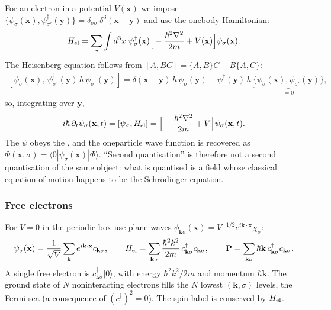 \documentclass[letterpaper,10pt,english]{jupyterBook}
\begin{document}
\sphinxAtStartPar
For an electron in a potential \(V(\mathbf x)\) we impose \(\{\psi_\sigma(\mathbf x),\psi_{\sigma'}^\dagger(\mathbf y)\}=\delta_{\sigma\sigma'}\delta^3(\mathbf x-\mathbf y)\) and use the one\sphinxhyphen{}body Hamiltonian:
\begin{equation*}
\begin{split}
H_{\rm el}=\sum_\sigma\int d^3x\;\psi_\sigma^\dagger(\mathbf x)\Big[-\frac{\hbar^2\nabla^2}{2m}+V(\mathbf x)\Big]\psi_\sigma(\mathbf x).
\end{split}
\end{equation*}
\sphinxAtStartPar
The Heisenberg equation follows from \([A,BC]=\{A,B\}C-B\{A,C\}\):
\begin{equation*}
\begin{split}
[\psi_\sigma(\mathbf x),\,\psi^\dagger_{\sigma'}(\mathbf y)\,h\,\psi_{\sigma'}(\mathbf y)]=\delta(\mathbf x-\mathbf y)\,h\,\psi_\sigma(\mathbf y)-\psi^\dagger(\mathbf y)\,h\,\underbrace{\{\psi_\sigma(\mathbf x),\psi_{\sigma'}(\mathbf y)\}}_{=0},
\end{split}
\end{equation*}
\sphinxAtStartPar
so, integrating over \(\mathbf y\),
\begin{equation*}
\begin{split}
i\hbar\,\partial_t\psi_\sigma(\mathbf x,t)=[\psi_\sigma,H_{\rm el}]=\Big[-\frac{\hbar^2\nabla^2}{2m}+V\Big]\psi_\sigma(\mathbf x,t).
\end{split}
\end{equation*}
\sphinxAtStartPar
The  \(\psi\) obeys the , and the one\sphinxhyphen{}particle wave function is recovered as \(\Phi(\mathbf x,\sigma)=\langle0|\psi_\sigma(\mathbf x)|\Phi\rangle\). “Second quantisation” is therefore not a second quantisation of the same object: what is quantised is a field whose classical equation of motion happens to be the Schrödinger equation.
\subsubsection*{Free electrons}

\sphinxAtStartPar
For \(V=0\) in the periodic box use plane waves \(\phi_{\mathbf k\sigma}(\mathbf x)=V^{-1/2}e^{i\mathbf k\cdot\mathbf x}\chi_\sigma\):
\begin{equation*}
\begin{split}
\psi_\sigma(\mathbf x)=\frac{1}{\sqrt V}\sum_{\mathbf k}e^{i\mathbf k\cdot\mathbf x}c_{\mathbf k\sigma},\qquad
H_{\rm el}=\sum_{\mathbf k\sigma}\frac{\hbar^2k^2}{2m}\,c^\dagger_{\mathbf k\sigma}c_{\mathbf k\sigma},\qquad
\mathbf P=\sum_{\mathbf k\sigma}\hbar\mathbf k\,c^\dagger_{\mathbf k\sigma}c_{\mathbf k\sigma}.
\end{split}
\end{equation*}
\sphinxAtStartPar
A single free electron is \(c^\dagger_{\mathbf k\sigma}|0\rangle\), with energy \(\hbar^2k^2/2m\) and momentum \(\hbar\mathbf k\). The ground state of \(N\) non\sphinxhyphen{}interacting electrons fills the \(N\) lowest \((\mathbf k,\sigma)\) levels, the Fermi sea (a consequence of \((c^\dagger)^2=0\)). The spin label is conserved by \(H_{\rm el}\).
\end{document}
